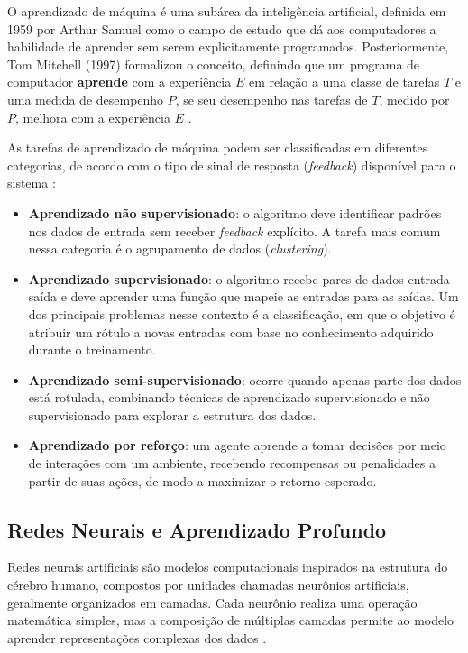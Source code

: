 \documentclass[12pt]{article}
\begin{document}
O aprendizado de máquina é uma subárea da inteligência artificial, definida em 1959 por Arthur Samuel como o campo de estudo que dá aos computadores a habilidade de aprender sem serem explicitamente programados. Posteriormente, Tom Mitchell (1997) formalizou o conceito, definindo que um programa de computador \textbf{aprende} com a experiência $E$ em relação a uma classe de tarefas $T$ e uma medida de desempenho $P$, se seu desempenho nas tarefas de $T$, medido por $P$, melhora com a experiência $E$ \cite{mitchell1997machine}.

As tarefas de aprendizado de máquina podem ser classificadas em diferentes categorias, de acordo com o tipo de sinal de resposta (\textit{feedback}) disponível para o sistema \cite{russell2010artificial}:

\begin{itemize}
    \item \textbf{Aprendizado não supervisionado}: o algoritmo deve identificar padrões nos dados de entrada sem receber \emph{feedback} explícito. A tarefa mais comum nessa categoria é o agrupamento de dados (\textit{clustering}).
    
    \item \textbf{Aprendizado supervisionado}: o algoritmo recebe pares de dados entrada-saída e deve aprender uma função que mapeie as entradas para as saídas. Um dos principais problemas nesse contexto é a classificação, em que o objetivo é atribuir um rótulo a novas entradas com base no conhecimento adquirido durante o treinamento.
    
    \item \textbf{Aprendizado semi-supervisionado}: ocorre quando apenas parte dos dados está rotulada, combinando técnicas de aprendizado supervisionado e não supervisionado para explorar a estrutura dos dados.
    
    \item \textbf{Aprendizado por reforço}: um agente aprende a tomar decisões por meio de interações com um ambiente, recebendo recompensas ou penalidades a partir de suas ações, de modo a maximizar o retorno esperado.
\end{itemize}

\subsection{Redes Neurais e Aprendizado Profundo}
\label{sec:review:deep_learning}

Redes neurais artificiais são modelos computacionais inspirados na estrutura do cérebro humano, compostos por unidades chamadas neurônios artificiais, geralmente organizados em camadas. Cada neurônio realiza uma operação matemática simples, mas a composição de múltiplas camadas permite ao modelo aprender representações complexas dos dados \cite{goodfellow2016}.
\end{document}
